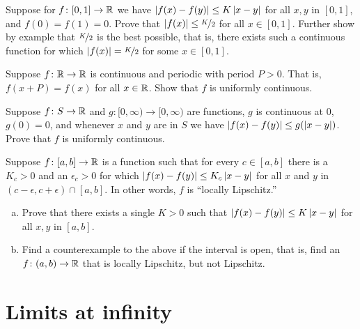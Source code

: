 \begin{exercise}
Suppose for $f \colon [0,1] \to {\mathbb{R}}$ we have $\left\lvert {f(x)-f(y)} \right\rvert \leq K
\left\lvert {x-y} \right\rvert$ for all $x,y$ in $[0,1]$,
and $f(0) = f(1) = 0$.
Prove that $\left\lvert {f(x)} \right\rvert \leq \nicefrac{K}{2}$ for all $x \in [0,1]$.  Further show by example that
$\nicefrac{K}{2}$ is the best possible, that is, there exists such a continuous function
for which $\left\lvert {f(x)} \right\rvert = \nicefrac{K}{2}$ for some $x \in [0,1]$.
\end{exercise}

\begin{exercise}
Suppose $f \colon {\mathbb{R}} \to {\mathbb{R}}$ is continuous and periodic with period
$P > 0$.  That is, $f(x+P) = f(x)$ for all $x \in {\mathbb{R}}$.  Show that $f$
is uniformly continuous.
\end{exercise}

\begin{exercise}
Suppose $f \colon S \to {\mathbb{R}}$ and $g \colon [0,\infty) \to [0,\infty)$
are functions, $g$ is continuous at $0$, $g(0) = 0$, and
whenever $x$ and $y$ are in $S$ we have $\left\lvert {f(x)-f(y)} \right\rvert \leq g(\left\lvert {x-y} \right\rvert)$.
Prove that $f$ is uniformly continuous.
\end{exercise}

\begin{exercise}
Suppose $f \colon [a,b] \to {\mathbb{R}}$ is a function such that for every $c \in
[a,b]$ there is a $K_c > 0$ and an $\epsilon_c > 0$ for which
$\left\lvert {f(x)-f(y)} \right\rvert \leq K_c \left\lvert {x-y} \right\rvert$ for all $x$ and $y$ in
$(c-\epsilon,c+\epsilon) \cap [a,b]$.  In other words, $f$ is ``locally Lipschitz.''
\begin{enumerate}[a)]
\item
Prove that there exists a single $K > 0$ such that
$\left\lvert {f(x)-f(y)} \right\rvert \leq K \left\lvert {x-y} \right\rvert$ for all $x,y$ in $[a,b]$.
\item
Find a counterexample to the above if the interval is open, that is,
find an $f \colon (a,b) \to {\mathbb{R}}$ that is locally Lipschitz, but not
Lipschitz.
\end{enumerate}
\end{exercise}


\sectionnewpage
\section{Limits at infinity}
\label{sec:limitatinf}


